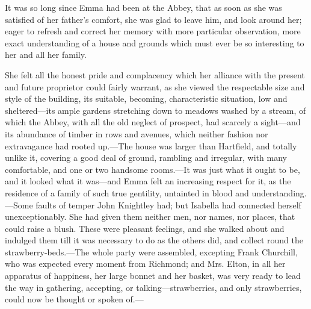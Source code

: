 It was so long since Emma had been at the Abbey, that as soon as she was satisfied of her father's comfort, she was glad to leave him, and look around her; eager to refresh and correct her memory with more particular observation, more exact understanding of a house and grounds which must ever be so interesting to her and all her family.

She felt all the honest pride and complacency which her alliance with the present and future proprietor could fairly warrant, as she viewed the respectable size and style of the building, its suitable, becoming, characteristic situation, low and sheltered---its ample gardens stretching down to meadows washed by a stream, of which the Abbey, with all the old neglect of prospect, had scarcely a sight---and its abundance of timber in rows and avenues, which neither fashion nor extravagance had rooted up.---The house was larger than Hartfield, and totally unlike it, covering a good deal of ground, rambling and irregular, with many comfortable, and one or two handsome rooms.---It was just what it ought to be, and it looked what it was---and Emma felt an increasing respect for it, as the residence of a family of such true gentility, untainted in blood and understanding.---Some faults of temper John Knightley had; but Isabella had connected herself unexceptionably. She had given them neither men, nor names, nor places, that could raise a blush. These were pleasant feelings, and she walked about and indulged them till it was necessary to do as the others did, and collect round the strawberry-beds.---The whole party were assembled, excepting Frank Churchill, who was expected every moment from Richmond; and Mrs. Elton, in all her apparatus of happiness, her large bonnet and her basket, was very ready to lead the way in gathering, accepting, or talking---strawberries, and only strawberries, could now be thought or spoken of.---

